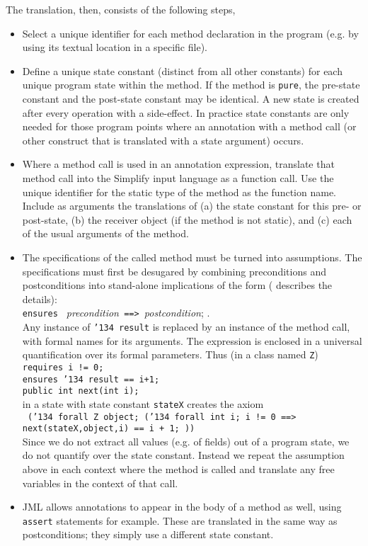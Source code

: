 \documentclass{sig-alternate}
\begin{document}
The translation, then, consists of the following steps,
\begin{itemize}
\item Select a unique identifier for each method declaration in the program (e.g. by using its
textual location in a specific file).
\item Define a unique state constant (distinct from all other constants) for each unique program
state within the method.  If the method is \texttt{pure}, the pre-state constant and the post-state
constant may be identical.  A new state is created after every operation with a side-effect.  In
practice state constants are only needed for those program points where an annotation with
a method call (or other construct that is translated with a state argument) occurs.
\item Where a method call is used in an annotation expression, translate that method call
into the Simplify input language as a function call.  Use the unique identifier for the static
type of the method as the function name.  Include as arguments the translations of (a) the
state constant for this pre- or post-state, (b) the receiver object (if the method is not static),
and (c) each of the usual arguments of the method.
\item The specifications of the called method must be turned into assumptions.  The 
specifications must first be desugared by combining preconditions and postconditions
into stand-alone implications of the form (\cite{Raghavan-Leavens03} describes the details): \\
{\centering \texttt{ensures } {\em precondition}\texttt{ ==> }{\em postcondition}; }.\\
Any instance of \texttt{\char'134 result} is replaced by an instance of the method call, with
formal names for its arguments.  The expression is enclosed in a universal quantification over
its formal parameters.  Thus (in a class named \texttt{Z})\\
\texttt{requires i != 0;}\\
\texttt{ensures \char'134 result == i+1; }\\
\texttt{public int next(int i);}\\
in a state with state constant \texttt{stateX} creates the axiom \\
\texttt{ (\char'134 forall Z object; (\char'134 forall int i;  i != 0 ==> \\
             next(stateX,object,i) == i + 1; ))} \\
Since we do not extract all values (e.g. of fields) out of a program state, we do not quantify over
the state constant.  Instead we repeat the assumption above in each context where the method
is called and translate any free variables in the context of that call.
\item JML allows annotations to appear in the body of a method as well, using \texttt{assert}
statements for example.  These are translated in the same way as postconditions; they simply
use a different state constant.
\end{itemize}
\end{document}
